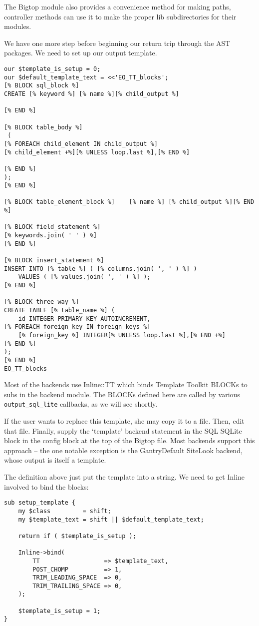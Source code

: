 The Bigtop module also provides a convenience method for making paths,
controller methods can use it to make the proper lib subdirectories for
their modules.

We have one more step before beginning our return trip through the AST
packages.  We need to set up our output template.

\begin{verbatim}
our $template_is_setup = 0;
our $default_template_text = <<'EO_TT_blocks';
[% BLOCK sql_block %]
CREATE [% keyword %] [% name %][% child_output %]

[% END %]

[% BLOCK table_body %]
 (
[% FOREACH child_element IN child_output %]
[% child_element +%][% UNLESS loop.last %],[% END %]

[% END %]
);
[% END %]

[% BLOCK table_element_block %]    [% name %] [% child_output %][% END %]

[% BLOCK field_statement %]
[% keywords.join( ' ' ) %]
[% END %]

[% BLOCK insert_statement %]
INSERT INTO [% table %] ( [% columns.join( ', ' ) %] )
    VALUES ( [% values.join( ', ' ) %] );
[% END %]

[% BLOCK three_way %]
CREATE TABLE [% table_name %] (
    id INTEGER PRIMARY KEY AUTOINCREMENT,
[% FOREACH foreign_key IN foreign_keys %]
    [% foreign_key %] INTEGER[% UNLESS loop.last %],[% END +%]
[% END %]
);
[% END %]
EO_TT_blocks
\end{verbatim}

Most of the backends use Inline::TT which binds Template Toolkit BLOCKs
to subs in the backend module.  The BLOCKs defined here are called
by various \verb+output_sql_lite+ callbacks, as we will see shortly.

If the user wants to replace this template, she may copy it to a file.
Then, edit that file.  Finally, supply the `template' backend statement
in the SQL SQLite block in the config block at the top of the Bigtop
file.  Most backends support this approach -- the one notable exception
is the GantryDefault SiteLook backend, whose output is itself a template.

The definition above just put the template into a string.  We need to get
Inline involved to bind the blocks:

\begin{verbatim}
sub setup_template {
    my $class         = shift;
    my $template_text = shift || $default_template_text;

    return if ( $template_is_setup );

    Inline->bind(
        TT                  => $template_text,
        POST_CHOMP          => 1,
        TRIM_LEADING_SPACE  => 0,
        TRIM_TRAILING_SPACE => 0,
    );

    $template_is_setup = 1;
}
\end{verbatim}

